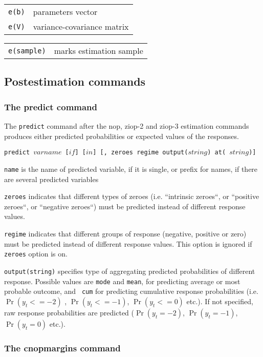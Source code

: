 \documentclass[letterpaper,fleqn,12pt]{article}
\begin{document}
\begin{onehalfspace}

\begin{tabular}{p{3cm}p{12cm}}
\texttt{e(b)} & parameters vector \\ 
\texttt{e(V)} & variance-covariance matrix%
\end{tabular}


\begin{tabular}{p{3cm}p{12cm}}
\texttt{e(sample)} & marks estimation sample%
\end{tabular}

\subsection*{Postestimation commands}

\subsubsection*{The predict command}

The \texttt{predict} command after the nop, ziop-2 and ziop-3 estimation
commands produces either predicted probabilities or expected values of the
responses.

\texttt{predict $varname$ [$if$] [$in$] [, zeroes regime output($string$) at(%
$string$)]}

\texttt{name} is the name of predicted variable, if it is single, or prefix
for names, if there are several predicted variables

\texttt{zeroes} indicates that different types of zeroes (i.e. ``intrinsic
zeroes``, or ``positive zeroes``, or ``negative zeroes``) must be predicted
instead of different response values.

\texttt{regime} indicates that different groups of response (negative,
positive or zero) must be predicted instead of different response values.
This option is ignored if \texttt{zeroes} option is on.

\texttt{output(string)} specifies type of aggregating predicted
probabilities of different response. Possible values are \texttt{mode} and 
\texttt{mean}, for predicting average or most probable outcome, and \texttt{%
cum} for predicting cumulative response probabilities (i.e. $\Pr (y_{t}<=-2)$%
, $\Pr (y_{t}<=-1)$, $\Pr (y_{t}<=0)$ etc.). If not specified, raw response
probabilities are predicted ($\Pr (y_{t}=-2)$, $\Pr (y_{t}=-1)$, $\Pr
(y_{t}=0)$ etc.).

\subsubsection*{The cnopmargins command}


\end{onehalfspace}
\end{document}
